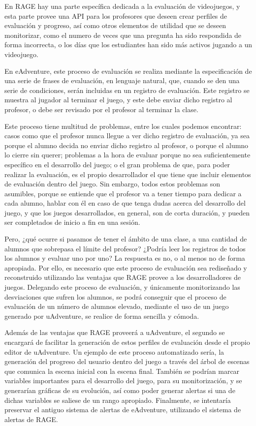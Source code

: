 En RAGE hay una parte específica dedicada a la evaluación de videojuegos, y esta parte provee una API para los profesores que deseen crear perfiles de evaluación y progreso, así como otros elementos de utilidad que se deseen monitorizar, como el numero de veces que una pregunta ha sido respondida de forma incorrecta, o los días que los estudiantes han sido más activos jugando a un videojuego.

En eAdventure, este proceso de evaluación se realiza mediante la especificación de una serie de frases de evaluación, en lenguaje natural, que, cuando se den una serie de condiciones, serán incluidas en un registro de evaluación. Este registro se muestra al jugador al terminar el juego, y este debe enviar dicho registro al profesor, o debe ser revisado por el profesor al terminar la clase.

Este proceso tiene multitud de problemas, entre los cuales podemos encontrar: casos como que el profesor nunca llegue a ver dicho registro de evaluación, ya sea porque el alumno decida no enviar dicho registro al profesor, o porque el alumno lo cierre sin querer; problemas a la hora de evaluar porque no sea suficientemente específico en el desarrollo del juego; o el gran problema de que, para poder realizar la evaluación, es el propio desarrollador el que tiene que incluir elementos de evaluación dentro del juego. Sin embargo, todos estos problemas son asumibles, porque se entiende que el profesor va a tener tiempo para dedicar a cada alumno, hablar con él en caso de que tenga dudas acerca del desarrollo del juego, y que los juegos desarrollados, en general, son de corta duración, y pueden ser completados de inicio a fin en una sesión.

Pero, ¿qué ocurre si pasamos de tener el ámbito de una clase, a una cantidad de alumnos que sobrepasa el límite del profesor? ¿Podría leer los registros de todos los alumnos y evaluar uno por uno? La respuesta es no, o al menos no de forma apropiada. Por ello, es necesario que este proceso de evaluación sea rediseñado y reconstruido utilizando las ventajas que RAGE provee a los desarrolladores de juegos. Delegando este proceso de evaluación, y únicamente monitorizando las desviaciones que sufren los alumnos, se podrá conseguir que el proceso de evaluación de un número de alumnos elevado, mediante el uso de un juego generado por uAdventure, se realice de forma sencilla y cómoda.

Además de las ventajas que RAGE proveerá a uAdventure, el segundo se encargará de facilitar la generación de estos perfiles de evaluación desde el propio editor de uAdventure. Un ejemplo de este proceso automatizado sería, la generación del progreso del usuario dentro del juego a través del árbol de escenas que comunica la escena inicial con la escena final. También se podrían marcar variables importantes para el desarrollo del juego, para su monitorización, y se generarían gráficas de su evolución, así como poder generar alertas si una de dichas variables se saliese de un rango apropiado. Finalmente, se intentaría preservar el antiguo sistema de alertas de eAdventure, utilizando el sistema de alertas de RAGE.

